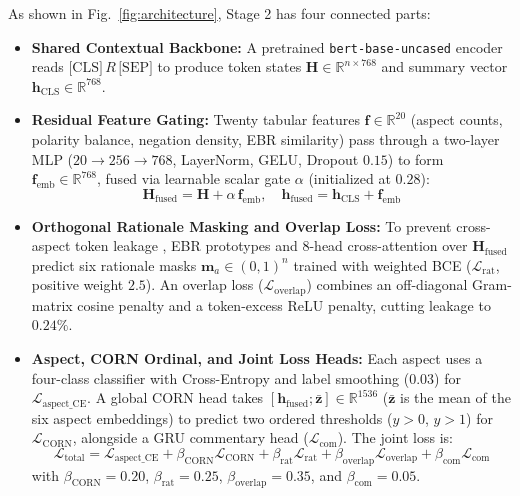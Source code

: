 \documentclass[pdflatex,sn-mathphys-num]{sn-jnl}%
\theoremstyle{thmstyleone}%
\theoremstyle{thmstyletwo}%
\theoremstyle{thmstylethree}%
\begin{document}
As shown in Fig.~\ref{fig:architecture}, Stage 2 has four connected parts:
\begin{itemize}
\item \textbf{Shared Contextual Backbone:} A pretrained \texttt{bert-base-uncased} encoder reads $\text{[CLS]} \, R \, \text{[SEP]}$ to produce token states $\mathbf{H} \in \mathbb{R}^{n \times 768}$ and summary vector $\mathbf{h}_{\text{CLS}} \in \mathbb{R}^{768}$.
\item \textbf{Residual Feature Gating:} Twenty tabular features $\mathbf{f} \in \mathbb{R}^{20}$ (aspect counts, polarity balance, negation density, EBR similarity) pass through a two-layer MLP ($20 \rightarrow 256 \rightarrow 768$, LayerNorm, GELU, Dropout $0.15$) to form $\mathbf{f}_{\text{emb}} \in \mathbb{R}^{768}$, fused via learnable scalar gate $\alpha$ (initialized at $0.28$):
\begin{equation}
\mathbf{H}_{\text{fused}} = \mathbf{H} + \alpha \, \mathbf{f}_{\text{emb}}, \quad \mathbf{h}_{\text{fused}} = \mathbf{h}_{\text{CLS}} + \mathbf{f}_{\text{emb}}
\end{equation}
\item \textbf{Orthogonal Rationale Masking and Overlap Loss:} To prevent cross-aspect token leakage \cite{ref30_tran2026}, EBR prototypes and 8-head cross-attention over $\mathbf{H}_{\text{fused}}$ predict six rationale masks $\mathbf{m}_a \in (0, 1)^n$ trained with weighted BCE ($\mathcal{L}_{\text{rat}}$, positive weight $2.5$). An overlap loss ($\mathcal{L}_{\text{overlap}}$) combines an off-diagonal Gram-matrix cosine penalty and a token-excess ReLU penalty, cutting leakage to $0.24\%$.
\item \textbf{Aspect, CORN Ordinal, and Joint Loss Heads:} Each aspect uses a four-class classifier with Cross-Entropy and label smoothing ($0.03$) for $\mathcal{L}_{\text{aspect\_CE}}$. A global CORN head takes $[\mathbf{h}_{\text{fused}}; \bar{\mathbf{z}}] \in \mathbb{R}^{1536}$ ($\bar{\mathbf{z}}$ is the mean of the six aspect embeddings) to predict two ordered thresholds ($y > 0$, $y > 1$) for $\mathcal{L}_{\text{CORN}}$, alongside a GRU commentary head ($\mathcal{L}_{\text{com}}$). The joint loss is:
\begin{equation}
\mathcal{L}_{\text{total}} = \mathcal{L}_{\text{aspect\_CE}} + \beta_{\text{CORN}} \mathcal{L}_{\text{CORN}} + \beta_{\text{rat}} \mathcal{L}_{\text{rat}} + \beta_{\text{overlap}} \mathcal{L}_{\text{overlap}} + \beta_{\text{com}} \mathcal{L}_{\text{com}}
\end{equation}
with $\beta_{\text{CORN}} = 0.20$, $\beta_{\text{rat}} = 0.25$, $\beta_{\text{overlap}} = 0.35$, and $\beta_{\text{com}} = 0.05$.
\end{itemize}
\FloatBarrier
\end{document}
